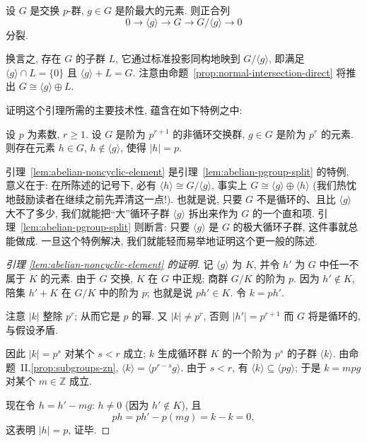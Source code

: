 \begin{lemma}
\label{lem:abelian-pgroup-split}
设 $G$ 是交换 $p$-群, $g \in G$ 是阶最大的元素. 则正合列
\[
0 \longrightarrow \langle g \rangle \longrightarrow G \longrightarrow G / \langle g \rangle \longrightarrow 0
\]
分裂.
\end{lemma}

换言之, 存在 $G$ 的子群 $L$, 它通过标准投影同构地映到 $G/\langle g\rangle$, 即满足 $\langle g\rangle \cap L = \{0\}$ 且 $\langle g\rangle + L = G$. 注意由命题~\ref{prop:normal-intersection-direct} 将推出 $G \cong \langle g\rangle \oplus L$.

证明这个引理所需的主要技术性, 蕴含在如下特例之中:

\begin{lemma}
\label{lem:abelian-noncyclic-element}
设 $p$ 为素数, $r \geq 1$. 设 $G$ 是阶为 $p^{r+1}$ 的非循环交换群, $g \in G$ 是阶为 $p^r$ 的元素. 则存在元素 $h \in G$, $h \notin \langle g\rangle$, 使得 $|h| = p$.
\end{lemma}

引理~\ref{lem:abelian-noncyclic-element} 是引理~\ref{lem:abelian-pgroup-split} 的特例, 意义在于: 在所陈述的记号下, 必有 $\langle h\rangle \cong G/\langle g\rangle$, 事实上 $G \cong \langle g\rangle \oplus \langle h\rangle$ (我们热忱地鼓励读者在继续之前先弄清这一点!). 也就是说, 只要 $G$ 不是循环的、且比 $\langle g\rangle$ 大不了多少, 我们就能把``大''循环子群 $\langle g\rangle$ 拆出来作为 $G$ 的一个直和项. 引理~\ref{lem:abelian-pgroup-split} 则断言: 只要 $\langle g\rangle$ 是 $G$ 的极大循环子群, 这件事就总能做成. 一旦这个特例解决, 我们就能轻而易举地证明这个更一般的陈述.

\begin{proof}[引理 \ref{lem:abelian-noncyclic-element} 的证明]
记 $\langle g\rangle$ 为 $K$, 并令 $h'$ 为 $G$ 中任一不属于 $K$ 的元素. 由于 $G$ 交换, $K$ 在 $G$ 中正规; 商群 $G/K$ 的阶为 $p$. 因为 $h' \notin K$, 陪集 $h' + K$ 在 $G/K$ 中的阶为 $p$; 也就是说 $p h' \in K$. 令 $k = p h'$.

注意 $|k|$ 整除 $p^r$; 从而它是 $p$ 的幂. 又 $|k| \neq p^r$, 否则 $|h'| = p^{r+1}$ 而 $G$ 将是循环的, 与假设矛盾.

因此 $|k| = p^s$ 对某个 $s < r$ 成立; $k$ 生成循环群 $K$ 的一个阶为 $p^s$ 的子群 $\langle k\rangle$. 由命题~II.\ref{prop:subgroups-zn}, $\langle k\rangle = \langle p^{r-s}g\rangle$. 由于 $s < r$, 有 $\langle k\rangle \subseteq \langle p g\rangle$; 于是 $k = m p g$ 对某个 $m \in \mathbb{Z}$ 成立.

现在令 $h = h' - m g$: $h \neq 0$ (因为 $h' \notin K$), 且
\[
p h = p h' - p(m g) = k - k = 0,
\]
这表明 $|h| = p$, 证毕.
\end{proof}


